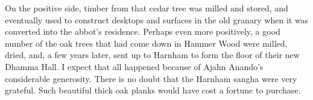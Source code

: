 On the positive side, timber from that cedar tree was milled and stored,
and eventually used to construct desktops and surfaces in the old
granary when it was converted into the abbot's residence. Perhaps even
more positively, a good number of the oak trees that had come down in
Hammer Wood were milled, dried, and, a few years later, sent up to
Harnham to form the floor of their new Dhamma Hall. I expect that all
happened because of Ajahn Anando's considerable generosity. There is no
doubt that the Harnham sangha were very grateful. Such beautiful thick
oak planks would have cost a fortune to purchase.




